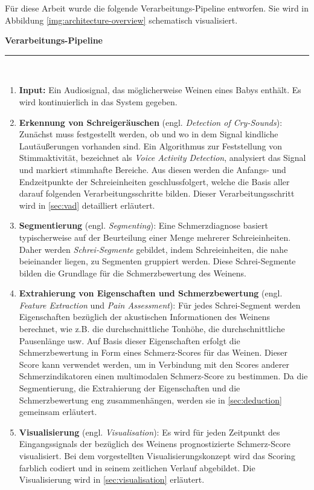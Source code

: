Für diese Arbeit wurde die folgende Verarbeitungs-Pipeline entworfen. Sie wird in Abbildung \autoref{img:architecture-overview} schematisch visualisiert. 
\vspace{4mm}

\noindent\textbf{Verarbeitungs-Pipeline}\noindent\rule{0.7\linewidth}{0.3pt} \\[-3mm]
\begin{enumerate}[leftmargin=*]
	\item \textbf{Input: } Ein Audiosignal, das möglicherweise Weinen eines Babys enthält. Es wird kontinuierlich in das System gegeben.
	
	\item \textbf{Erkennung von Schreigeräuschen} (engl. \emph{Detection of Cry-Sounds}): Zunächst muss festgestellt werden, ob und wo in dem Signal kindliche Lautäußerungen vorhanden sind. Ein Algorithmus zur Feststellung von Stimmaktivität, bezeichnet als \emph{Voice Activity Detection}, analysiert das Signal und markiert stimmhafte Bereiche. Aus diesen werden die Anfangs- und Endzeitpunkte der Schreieinheiten geschlussfolgert, welche die Basis aller darauf folgenden Verarbeitungsschritte bilden. Dieser Verarbeitungsschritt wird in \autoref{sec:vad} detailliert erläutert.
	
	\item \textbf{Segmentierung} (engl. \emph{Segmenting}): Eine Schmerzdiagnose basiert typischerweise auf der Beurteilung einer Menge mehrerer Schreieinheiten. Daher werden \emph{Schrei-Segmente} gebildet, indem Schreieinheiten, die nahe beieinander liegen, zu Segmenten gruppiert werden. Diese Schrei-Segmente bilden die Grundlage für die Schmerzbewertung des Weinens. 
		
	\item \textbf{Extrahierung von Eigenschaften und Schmerzbewertung} (engl. \emph{Feature Extraction} und \emph{Pain Assessment}): Für jedes Schrei-Segment werden Eigenschaften bezüglich der akustischen Informationen des Weinens berechnet, wie z.B. die durchschnittliche Tonhöhe, die durchschnittliche Pausenlänge usw. Auf Basis dieser Eigenschaften erfolgt die Schmerzbewertung in Form eines Schmerz-Scores für das Weinen. Dieser Score kann verwendet werden, um in Verbindung mit den Scores anderer Schmerzindikatoren einen multimodalen Schmerz-Score zu bestimmen. Da die Segmentierung, die Extrahierung der Eigenschaften und die Schmerzbewertung eng zusammenhängen, werden sie in \autoref{sec:deduction} gemeinsam erläutert.
	
	\item \textbf{Visualisierung} (engl. \emph{Visualisation}): Es wird für jeden Zeitpunkt des Eingangssignals der bezüglich des Weinens prognostizierte Schmerz-Score visualisiert. Bei dem vorgestellten Visualisierungskonzept wird das Scoring farblich codiert und in seinem zeitlichen Verlauf abgebildet. Die Visualisierung wird in \autoref{sec:visualisation} erläutert.	
	\end{enumerate}
	
